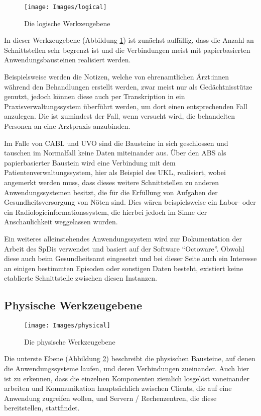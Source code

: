 \begin{figure}[h]
	\centering
	\texttt{[image: Images/logical]}
	\caption[Logische Werkzeugebene]{Die logische Werkzeugebene}
	\label{fig:logical}
\end{figure}

In dieser Werkzeugebene (Abbildung \ref{fig:logical}) ist zunächst auffällig, dass die Anzahl an Schnittstellen sehr begrenzt ist und die Verbindungen meist mit papierbasierten Anwendungsbausteinen realisiert werden.

Beispielsweise werden die Notizen, welche von ehrenamtlichen Ärzt:innen während den Behandlungen erstellt werden, zwar meist nur als Gedächtnisstütze genutzt, jedoch können diese auch per Transkription in ein Praxisverwaltungssystem überführt werden, um dort einen entsprechenden Fall anzulegen. Die ist zumindest der Fall, wenn versucht wird, die behandelten Personen an eine Arztpraxis anzubinden.

Im Falle von \ac{CABL} und \ac{UVO} sind die Bausteine in sich geschlossen und tauschen im Normalfall keine Daten miteinander aus. Über den \ac{ABS} als papierbasierter Baustein wird eine Verbindung mit dem Patientenverwaltungssystem, hier als Beispiel des \ac{UKL}, realisiert, wobei angemerkt werden muss, dass dieses weitere Schnittstellen zu anderen Anwendungssystemen besitzt, die für die Erfüllung von Aufgaben der Gesundheitsversorgung von Nöten sind. Dies wären beispielsweise ein Labor- oder ein Radiologieinformationssystem, die hierbei jedoch im Sinne der Anschaulichkeit weggelassen wurden.

Ein weiteres alleinstehendes Anwendungssystem wird zur Dokumentation der Arbeit des \acp{SpDi} verwendet und basiert auf der Software \enquote{Octoware}. Obwohl diese auch beim Gesundheitsamt eingesetzt und bei dieser Seite auch ein Interesse an einigen bestimmten Episoden oder sonstigen Daten besteht, existiert keine etablierte Schnittstelle zwischen diesen Instanzen.

\subsection{Physische Werkzeugebene}

\begin{figure}[h]
	\centering
	\texttt{[image: Images/physical]}
	\caption[Physische Werkzeugebene]{Die physische Werkzeugebene}
	\label{fig:physical}
\end{figure}

Die unterste Ebene (Abbildung \ref{fig:physical}) beschreibt die physischen Bausteine, auf denen die Anwendungssysteme laufen, und deren Verbindungen zueinander. Auch hier ist zu erkennen, dass die einzelnen Komponenten ziemlich losgelöst voneinander arbeiten und Kommunikation hauptsächlich zwischen Clients, die auf eine Anwendung zugreifen wollen, und Servern / Rechenzentren, die diese bereitstellen, stattfindet.

